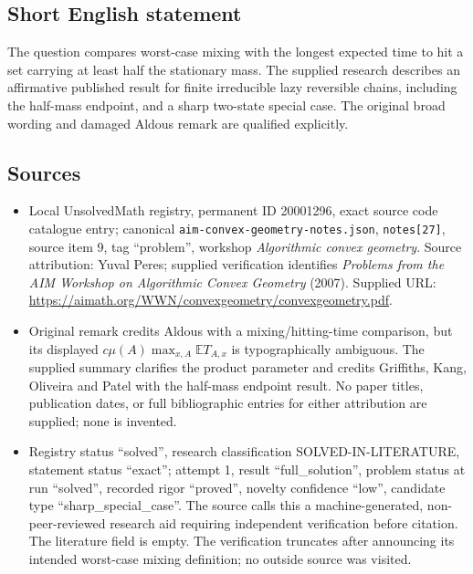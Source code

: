 \documentclass[11pt]{article}
\newcommand{\E}{\mathbb{E}}
\begin{document}
\subsection{Short English statement}
The question compares worst-case mixing with the longest expected time to hit a set carrying at least half the stationary mass. The supplied research describes an affirmative published result for finite irreducible lazy reversible chains, including the half-mass endpoint, and a sharp two-state special case. The original broad wording and damaged Aldous remark are qualified explicitly.
\subsection{Sources}
\begin{itemize}
\item Local UnsolvedMath registry, permanent ID 20001296, exact source code catalogue entry; canonical \texttt{aim-convex-geometry-notes.json}, \texttt{notes[27]}, source item 9, tag ``problem'', workshop \emph{Algorithmic convex geometry}. Source attribution: Yuval Peres; supplied verification identifies \emph{Problems from the AIM Workshop on Algorithmic Convex Geometry} (2007). Supplied URL: \url{https://aimath.org/WWN/convexgeometry/convexgeometry.pdf}.
\item Original remark credits Aldous with a mixing/hitting-time comparison, but its displayed $c\mu(A)\max_{x,A}\E T_{A,x}$ is typographically ambiguous. The supplied summary clarifies the product parameter and credits Griffiths, Kang, Oliveira and Patel with the half-mass endpoint result. No paper titles, publication dates, or full bibliographic entries for either attribution are supplied; none is invented.
\item Registry status ``solved'', research classification SOLVED-IN-LITERATURE, statement status ``exact''; attempt 1, result ``full\_solution'', problem status at run ``solved'', recorded rigor ``proved'', novelty confidence ``low'', candidate type ``sharp\_special\_case''. The source calls this a machine-generated, non-peer-reviewed research aid requiring independent verification before citation. The literature field is empty. The verification truncates after announcing its intended worst-case mixing definition; no outside source was visited.
\end{itemize}
\end{document}
